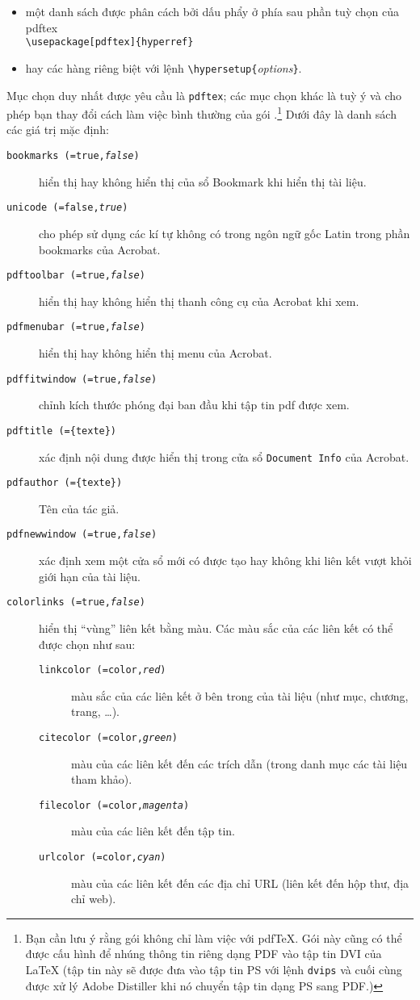 \begin{itemize}
\item một danh sách được phân cách bởi dấu phẩy ở phía sau phần tuỳ chọn của pdftex\\ \verb+\usepackage[pdftex]{hyperref}+
\item hay các hàng riêng biệt với lệnh
\verb+\hypersetup{+\emph{options}\verb+}+.
\end{itemize}
Mục chọn duy nhất được yêu cầu là \texttt{pdftex}; các mục chọn khác là tuỳ ý và cho phép bạn thay đổi cách làm việc bình thường của gói .\footnote{Bạn cần lưu ý rằng gói  không chỉ làm việc với pdf\TeX{}. Gói này cũng có thể được cấu hình để nhúng thông tin riêng dạng PDF vào tập tin DVI của \LaTeX{} (tập tin này sẽ được đưa vào tập tin PS với lệnh \texttt{dvips} và cuối cùng được xử lý Adobe Distiller khi nó chuyển tập tin dạng PS sang PDF.)} Dưới đây là danh sách các giá trị mặc định:
\begin{description}
  \item[\texttt{bookmarks (=true,\textit{false})}] hiển thị hay
  không hiển thị của sổ Bookmark khi hiển thị tài liệu.
  \item[\texttt{unicode (=false,\textit{true})}] cho phép sử dụng các kí tự không có trong ngôn ngữ gốc Latin trong phần bookmarks của Acrobat.
  \item [\texttt{pdftoolbar (=true,\textit{false})}] hiển thị hay không hiển thị thanh công cụ của Acrobat khi xem.
  \item [\texttt{pdfmenubar (=true,\textit{false})}] hiển thị hay không hiển thị menu của Acrobat.
  \item [\texttt{pdffitwindow (=true,\textit{false})}] chỉnh kích thước phóng đại ban đầu khi tập tin pdf được xem.
  \item [\texttt{pdftitle (=\{texte\})}] xác định nội dung được hiển thị trong cửa sổ \texttt{Document Info} của Acrobat.
  \item [\texttt{pdfauthor (=\{texte\})}] Tên của tác giả.
  \item [\texttt{pdfnewwindow (=true,\textit{false})}] xác định xem một cửa sổ mới có được tạo hay không khi liên kết vượt khỏi giới hạn của tài liệu.
  \item [\texttt{colorlinks (=true,\textit{false})}] hiển thị ``vùng'' liên kết bằng màu. Các màu sắc của các liên kết có thể
  được chọn như sau:
    \begin{description}
    \item [\texttt{linkcolor (=color,\textit{red})}] màu sắc của
    các liên kết ở bên trong của tài liệu (như mục, chương, trang,
    \ldots).
    \item [\texttt{citecolor (=color,\textit{green})}] màu của các
    liên kết đến các trích dẫn (trong danh mục các tài liệu tham
    khảo).
    \item [\texttt{filecolor (=color,\textit{magenta})}] màu của
    các liên kết đến tập tin.
    \item [\texttt{urlcolor (=color,\textit{cyan})}] màu của các
    liên kết đến các địa chỉ URL (liên kết đến hộp thư, địa chỉ web).
    \end{description}
\end{description}

